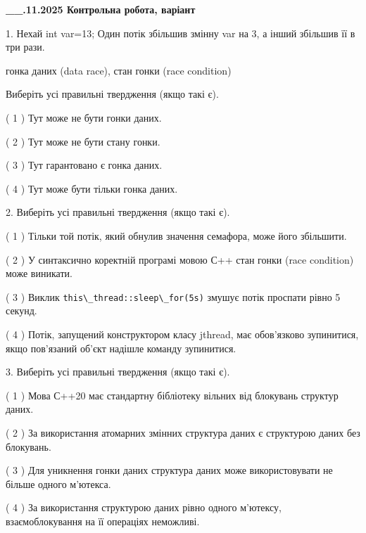 \documentclass[12pt, ukrainian]{article}
\def\code#1{\Verb!#1!}
\begin{document}
\newpage
\begin {large}

\textbf{\_\_.11.2025 Контрольна робота, варіант  }\par


{
1. Нехай int var=13; Один потік збільшив змінну var на 3, а інший збільшив її в три рази.

гонка даних (data race), стан гонки (race condition)

Виберіть усі правильні твердження (якщо такі є).\par
\vspace{2mm}
( 1 ) Тут може не бути гонки даних.%

( 2 ) Тут може не бути стану гонки.%

( 3 ) Тут гарантовано є гонка даних.%

( 4 ) Тут може бути тільки гонка даних.%


2. Виберіть усі правильні твердження (якщо такі є).\par
\vspace{2mm}

( 1 ) Тільки той потік, який обнулив значення семафора, може його збільшити.%

( 2 ) У синтаксично коректній програмі мовою С++ стан гонки (race condition) може виникати.%

( 3 ) Виклик \code{this\_thread::sleep\_for(5s)} змушує потік проспати рівно 5 секунд.%

( 4 ) Потік, запущений конструктором класу jthread, має обов’язково зупинитися, якщо пов’язаний об’єкт надішле команду зупинитися.%


3. Виберіть усі правильні твердження (якщо такі є).\par
\vspace{2mm}

( 1 ) Мова С++20 має стандартну бібліотеку вільних від блокувань структур даних.%

( 2 ) За використання атомарних змінних структура даних є структурою даних без блокувань.%

( 3 ) Для уникнення гонки даних структура даних може використовувати не більше одного м’ютекса.%

( 4 ) За використання структурою даних рівно одного м’ютексу, взаємоблокування на її операціях неможливі.%


}
\end{large}
\end{document}
